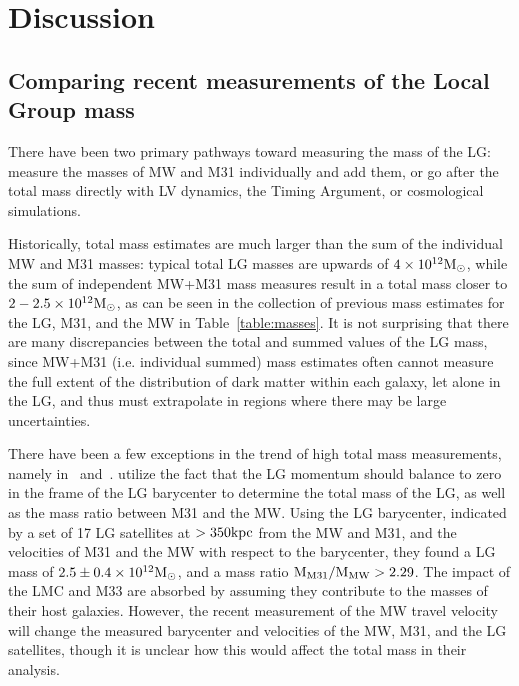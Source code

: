 \documentclass[twocolumn]{aastex631}
\begin{document}
\section{Discussion}
\label{sec:discussion}

\subsection{Comparing recent measurements of the Local Group mass}
There have been two primary pathways toward measuring the mass of the LG:
measure the masses of MW and M31 individually and add them, or go after the
total mass directly with LV dynamics, the Timing Argument, or cosmological
simulations.

Historically, total mass estimates are much larger than the sum of the
individual MW and M31 masses:
typical total LG masses are upwards of $4\times 10^{12}\mathrm{M}_\odot$, while the sum of
independent MW+M31 mass measures result in a total mass closer to
$2-2.5\times 10^{12}\mathrm{M}_\odot$, as can be seen in the collection of previous mass
estimates for the LG, M31, and the MW in Table~\ref{table:masses}.
It is not surprising that there are many discrepancies between the total and
summed values of the LG mass, since MW+M31 (i.e. individual summed) mass
estimates often cannot measure the full extent of the distribution of dark
matter within each galaxy, let alone in the LG, and thus must extrapolate in
regions where there may be large uncertainties.

There have been a few exceptions in the trend of high total mass measurements,
namely in~\cite{Diaz2014} and~\cite{Penarrubia2016}.
\cite{Diaz2014} utilize the fact that the LG momentum should balance to zero in
the frame of the LG barycenter to determine the total mass of the LG, as well as
the mass ratio between M31 and the MW. Using the LG barycenter, indicated by a
set of 17 LG satellites at $>350\mathrm{kpc}$ from the MW and M31, and the velocities of
M31 and the MW with respect to the barycenter, they found a LG mass of
$2.5\pm0.4\times10^{12}\mathrm{M}_\odot$, and a mass ratio $\rm M_{M31}/M_{MW}>2.29$.
The impact of the LMC and M33 are absorbed by assuming they contribute to the
masses of their host galaxies.
However, the recent measurement of the MW travel velocity will change the
measured barycenter and velocities of the MW, M31, and the LG satellites, though
it is unclear how this would affect the total mass in their analysis.
\end{document}
